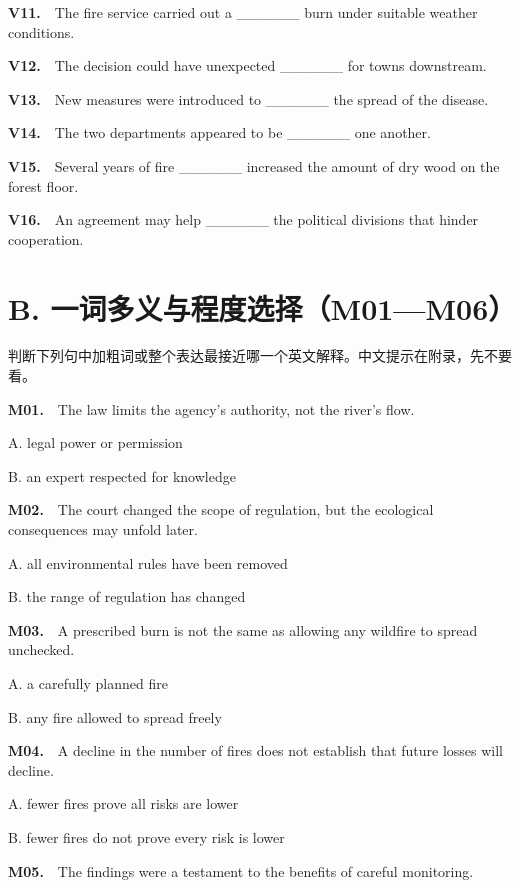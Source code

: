 \documentclass[a4paper,11pt,openany]{report}
\begin{document}
\textbf{V11.}　The fire service carried out a \_\_\_\_\_\_ burn under suitable weather conditions.

\textbf{V12.}　The decision could have unexpected \_\_\_\_\_\_ for towns downstream.

\textbf{V13.}　New measures were introduced to \_\_\_\_\_\_ the spread of the disease.

\textbf{V14.}　The two departments appeared to be \_\_\_\_\_\_ one another.

\textbf{V15.}　Several years of fire \_\_\_\_\_\_ increased the amount of dry wood on the forest floor.

\textbf{V16.}　An agreement may help \_\_\_\_\_\_ the political divisions that hinder cooperation.

\section{B. 一词多义与程度选择（M01---M06）}\label{b.-ux4e00ux8bcdux591aux4e49ux4e0eux7a0bux5ea6ux9009ux62e9m01m06}

判断下列句中加粗词或整个表达最接近哪一个英文解释。中文提示在附录，先不要看。

\textbf{M01.}　The law limits the agency's authority, not the river's flow.

A. legal power or permission

B. an expert respected for knowledge

\textbf{M02.}　The court changed the scope of regulation, but the ecological consequences may unfold later.

A. all environmental rules have been removed

B. the range of regulation has changed

\textbf{M03.}　A prescribed burn is not the same as allowing any wildfire to spread unchecked.

A. a carefully planned fire

B. any fire allowed to spread freely

\textbf{M04.}　A decline in the number of fires does not establish that future losses will decline.

A. fewer fires prove all risks are lower

B. fewer fires do not prove every risk is lower

\textbf{M05.}　The findings were a testament to the benefits of careful monitoring.
\end{document}

